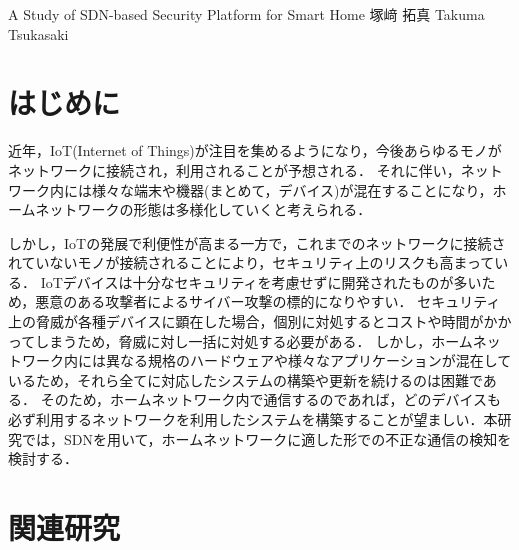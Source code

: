 \documentclass[a4paper,10pt,twocolumn,uplatex]{jsarticle}
\date{9}
\begin{document}
{A Study of SDN-based Security Platform for Smart Home}
{塚﨑 拓真}
{Takuma Tsukasaki}

\section{はじめに}
近年，IoT(Internet of Things)が注目を集めるようになり，今後あらゆるモノがネットワークに接続され，利用されることが予想される．
それに伴い，ネットワーク内には様々な端末や機器(まとめて，デバイス)が混在することになり，ホームネットワークの形態は多様化していくと考えられる．\par
しかし，IoTの発展で利便性が高まる一方で，これまでのネットワークに接続されていないモノが接続されることにより，セキュリティ上のリスクも高まっている\cite{guideline}．
IoTデバイスは十分なセキュリティを考慮せずに開発されたものが多いため，悪意のある攻撃者によるサイバー攻撃の標的になりやすい．
セキュリティ上の脅威が各種デバイスに顕在した場合，個別に対処するとコストや時間がかかってしまうため，脅威に対し一括に対処する必要がある．
しかし，ホームネットワーク内には異なる規格のハードウェアや様々なアプリケーションが混在しているため，それら全てに対応したシステムの構築や更新を続けるのは困難である．
そのため，ホームネットワーク内で通信するのであれば，どのデバイスも必ず利用するネットワークを利用したシステムを構築することが望ましい．本研究では，SDNを用いて，ホームネットワークに適した形での不正な通信の検知を検討する．

\section{関連研究}
\end{document}
